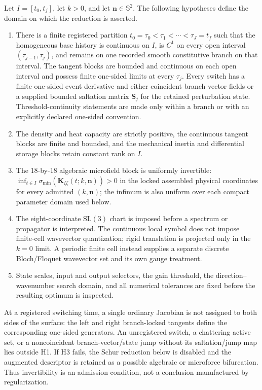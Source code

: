 Let $I=[t_0,t_f]$, let $k>0$, and let $\boldsymbol n\in\mathbb S^2$.  The
following hypotheses define the domain on which the reduction is asserted.
\begin{enumerate}
\item[(H1)] There is a finite registered partition
  $t_0=\tau_0<\tau_1<\cdots<\tau_J=t_f$ such that the homogeneous base
  history is continuous on $I$, is $C^1$ on every open interval
  $(\tau_{j-1},\tau_j)$, and remains on one recorded smooth constitutive
  branch on that interval.  The tangent blocks are bounded and continuous on
  each open interval and possess finite one-sided limits at every $\tau_j$.
  Every switch has a finite one-sided event derivative and either coincident
  branch vector fields or a supplied bounded saltation matrix
  $\boldsymbol S_j$ for the retained perturbation state.
  Threshold-continuity statements are made only within a branch or with an
  explicitly declared one-sided convention.
\item[(H2)] The density and heat capacity are strictly positive, the continuous
  tangent blocks are finite and bounded, and the mechanical inertia and
  differential storage blocks retain constant rank on $I$.
\item[(H3)] The 18-by-18 algebraic microfield block is uniformly invertible:
  $\inf_{t\in I}\sigma_{\min}
  (\boldsymbol K_{\zeta\zeta}(t;k,\boldsymbol n))>0$ in the locked assembled
  physical coordinates for every admitted $(k,\boldsymbol n)$; the infimum is
  also uniform over each compact parameter domain used below.
\item[(H4)] The eight-coordinate $\mathrm{SL}(3)$ chart is imposed before a
  spectrum or propagator is interpreted.  The continuous local symbol does not
  impose finite-cell wavevector quantization; rigid translation is projected
  only in the $k=0$ limit.  A periodic finite cell instead supplies a separate
  discrete Bloch/Floquet wavevector set and its own gauge treatment.
\item[(H5)] State scales, input and output selectors, the gain threshold, the
  direction--wavenumber search domain, and all numerical tolerances are fixed
  before the resulting optimum is inspected.
\end{enumerate}
At a registered switching time, a single ordinary Jacobian is not assigned to
both sides of the surface: the left and right branch-locked tangents define the
corresponding one-sided generators.  An unregistered switch, a chattering
active set, or a noncoincident branch-vector/state jump without its
saltation/jump map lies outside H1.  If H3
fails, the Schur reduction below is disabled and the
augmented descriptor is retained as a possible algebraic or microforce
bifurcation.  Thus invertibility is an admission condition, not a conclusion
manufactured by regularization.

